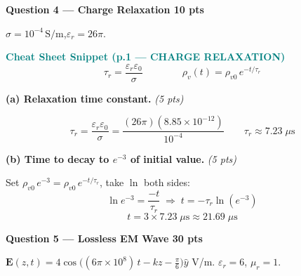 \documentclass[11pt,letterpaper]{article}
\begin{document}
\newpage
\colorbox{coralbg}{\parbox{\dimexpr\linewidth-2\fboxsep}{\color{coral}\large\textbf{Question 4 --- Charge Relaxation \hfill 10 pts}}}

\vspace{4pt}
$\sigma=10^{-4}\,\text{S/m}$,\quad $\varepsilon_r=26\pi$.

\begin{cssnip}
\textbf{\small\textcolor{teal}{Cheat Sheet Snippet (p.1 --- CHARGE RELAXATION)}}\\[4pt]
\[
\tau_r = \frac{\varepsilon_r\varepsilon_0}{\sigma}
\qquad\qquad
\rho_v(t) = \rho_{v0}\,e^{-t/\tau_r}
\]
\end{cssnip}

\textbf{(a) Relaxation time constant.} \hfill\textit{(5 pts)}

\[
\tau_r = \frac{\varepsilon_r\varepsilon_0}{\sigma}
= \frac{(26\pi)(8.85\times10^{-12})}{10^{-4}}
\qquad
\boxed{\tau_r \approx 7.23\;\mu\text{s}}
\]

\textbf{(b) Time to decay to $e^{-3}$ of initial value.} \hfill\textit{(5 pts)}

Set $\rho_{v0}\,e^{-3} = \rho_{v0}\,e^{-t/\tau_r}$, take $\ln$ both sides:
\[
\ln e^{-3} = \frac{-t}{\tau_r}
\;\Rightarrow\;
t = -\tau_r\ln(e^{-3})
\]
\[
\boxed{t = 3\times7.23\;\mu\text{s} \approx 21.69\;\mu\text{s}}
\]

\newpage
\colorbox{purplebg}{\parbox{\dimexpr\linewidth-2\fboxsep}{\color{purple}\large\textbf{Question 5 --- Lossless EM Wave \hfill 30 pts}}}

\vspace{4pt}
$\mathbf{E}(z,t)=4\cos\!\bigl((6\pi\times10^8)\,t-kz-\tfrac{\pi}{6}\bigr)\hat{y}$ V/m.\quad
$\varepsilon_r=6$,\; $\mu_r=1$.
\end{document}
